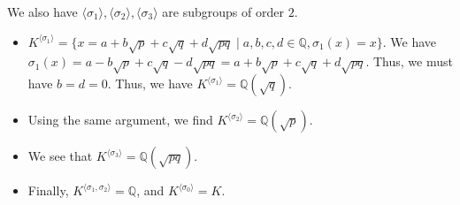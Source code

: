 \documentclass[10pt]{extarticle}
\newcommand{\Q}{\mathbb{Q}}
\begin{document}
\begin{enumerate}[(1)]
      We also have $\langle\sigma_1\rangle,\langle\sigma_2\rangle,\langle\sigma_3\rangle$ are subgroups of order $2$.
      \begin{itemize}
        \item $K^{\langle \sigma_1\rangle} = \{x = a+b\sqrt{p} + c\sqrt{q} + d\sqrt{pq}\mid a,b,c,d\in\Q,\sigma_1(x) = x\}$. We have $\sigma_1(x) = a - b\sqrt{p} + c\sqrt{q} - d\sqrt{pq} = a + b\sqrt{p} + c\sqrt{q} + d\sqrt{pq}$. Thus, we must have $b = d = 0$. Thus, we have $K^{\langle \sigma_1\rangle} = \Q(\sqrt{q})$.
        \item Using the same argument, we find $K^{\langle \sigma_2\rangle} = \Q(\sqrt{p})$.
        \item We see that $K^{\langle \sigma_3\rangle} = \Q(\sqrt{pq})$.
        \item Finally, $K^{\langle \sigma_1,\sigma_2\rangle} = \Q$, and $K^{\langle \sigma_0\rangle} = K$.
      \end{itemize}
      \begin{center}
\end{center}
\end{enumerate}
\end{document}
